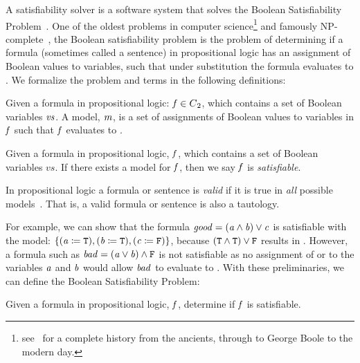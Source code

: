 \label{section:sat-solving}
%

A satisfiability solver is a software system that solves the Boolean
Satisfiability Problem~\cite{russelNorvig}. One of the oldest problems in
computer science\footnote{see~\citet{BBH+09} for a complete history from the
  ancients, through to George Boole to the modern day.} and famously
NP-complete~\cite{10.1145/800157.805047}, the Boolean satisfiability problem is
the problem of determining if a formula (sometimes called a sentence) in
propositional logic has an assignment of Boolean values to variables, such that
under substitution the formula evaluates to \tru{}. We formalize the problem and
terms in the following definitions:

\begin{definition}[Model]
  Given a formula in propositional logic: $\mathit{f} \in {C\textsubscript{2}}{}$, which contains a
  set of Boolean variables $\mathit{vs}$. A model, $\mathit{m}$, is a set of assignments
  of Boolean values to variables in $\mathit{f}$ such that $\mathit{f}$ evaluates to
  \tru{}.
\end{definition}

\begin{definition}[Satisfiable]
  Given a formula in propositional logic, $\mathit{f}$, which contains a set of
  Boolean variables $vs$. If there exists a model for $\mathit{f}$, then we say
  $\mathit{f}$ is \emph{satisfiable}.
\end{definition}
%
\begin{corollary}[Validity]
  In propositional logic a formula or sentence is \emph{valid} if it is true in
  \emph{all} possible models~\cite{russelNorvig}. That is, a valid formula or
  sentence is also a tautology.
\end{corollary}


For example, we can show that the formula $\mathit{good = (a \wedge b) \vee c}$ is
satisfiable with the model: $\{\mathit{(a \coloneqq{}{} \texttt{T}{}), (b \coloneqq{}{} \texttt{T}{}),
  (c \coloneqq{}{} \texttt{F}{})}\}$, because $(\texttt{T}{} \wedge{} \texttt{T}{}) \vee{} \texttt{F}{}$
results in \tru{}. However, a formula such as $\mathit{bad = (a \vee b) \wedge
  \texttt{F}{}}$ is not satisfiable as no assignment of \fls{} or \tru{} to the
variables $\mathit{a}$ and $\mathit{b}$ would allow $\mathit{bad}$ to evaluate to \tru{}.
With these preliminaries, we can define the Boolean Satisfiability Problem:

\begin{definition}
  Given a formula in propositional logic, $\mathit{f}$, determine if $\mathit{f}$ is
  satisfiable.
\end{definition}

